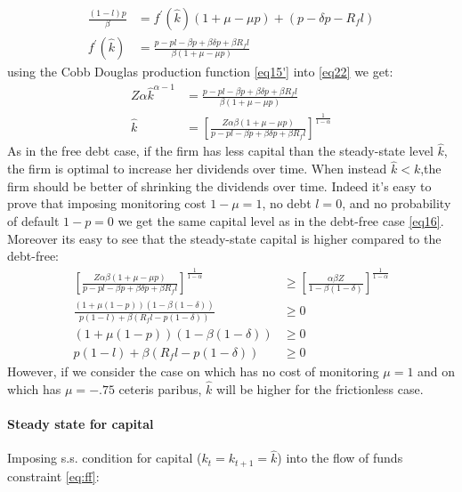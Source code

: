 \documentclass[12pt]{article}
\begin{document}
\begin{align}
    \frac{\left(1-l \right) p}{\beta} &= f^{\prime}(\hat{k})\left({1+\mu-\mu p}\right) + \left({p-\delta p - R_f l}\right) \nonumber\\
    f^{\prime}(\hat{k})&=\frac{p -p l - \beta p + \beta \delta p + \beta R_f l}{\beta \left(1+\mu-\mu p\right)} \label{eq22}
\end{align}
using the Cobb Douglas production function \ref{eq15'} into \ref{eq22} we get:
\begin{align}
    Z \alpha\hat{k}^{\alpha-1} &= \frac{p -p l - \beta p + \beta \delta p + \beta R_f l}{\beta \left(1+\mu-\mu p\right)} \nonumber \\
    \hat{k} &=\left[\frac{Z \alpha \beta \left(1+\mu-\mu p\right)}{p -p l - \beta p + \beta \delta p + \beta R_f l}\right]^{\frac{1}{1-\alpha}} \label{eq23}
\end{align}
As in the free debt case, if the firm has less capital than the steady-state level \(\hat{k}\), the firm is optimal
to increase her dividends over time. When instead \(\hat{k}<k\),the firm should be better of shrinking the dividends
over time. Indeed it's easy to prove that imposing monitoring cost \(1-\mu=1\), no debt \(l=0\), and no probability of
default \(1-p=0\) we get the same capital level as in the debt-free case \ref{eq16}. Moreover its easy to see that the
steady-state capital is higher compared to the debt-free:
\begin{align*}
    \left[\frac{Z \alpha \beta (1+\mu-\mu p)}{p - p l - \beta p + \beta \delta p + \beta R_f l}\right]^{\frac{1}{1-\alpha}} &\geq \left[\frac{\alpha \beta Z}{1 - \beta(1-\delta)}\right]^{\frac{1}{1-\alpha}} \\
    \frac{(1+\mu(1-p))(1-\beta(1-\delta))}{p(1-l)+\beta(R_f l - p(1-\delta))} &\geq 0 \\
    (1+\mu(1-p))(1-\beta(1-\delta)) &\geq 0 \\
    p(1-l)+\beta(R_f l - p(1-\delta)) &\geq 0
\end{align*}
However, if we consider the case on which has no cost of monitoring \(\mu=1\) and on which has \(\mu=-.75\) ceteris
paribus, \(\hat{k}\) will be higher for the frictionless case. 

\paragraph{Steady state for capital}
Imposing s.s. condition for capital (\(k_t=k_{t+1}=\hat{k}\)) into the flow of funds constraint \ref{eq:ff}:
\end{document}
